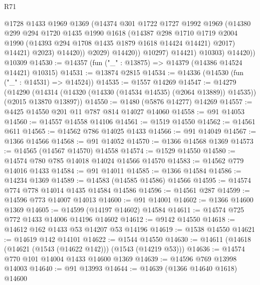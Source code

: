 \begin{lexlean}{R71}
\begin{coremodule}
                        @1728
                        @1433
                        @1969
                        @1369
                        (@14374
                          @301
                          @1722
                          @1727
                          @1992
                          @1969
                          (@14380
                            @299
                            @294
                            @1720
                            @1435
                            @1990
                            @1618
                            (@14387
                              @298
                              @1710
                              @1719
                              @2004
                              @1990
                              (@14393 @294 @1708 @1435 @1879 @1618 @14424 @14421)
                              @2017)
                            @14421)
                          @2023)
                        @14420))
                    @2029)
                  @14420))
              @10297)
            @14421)
          @10303)
        @14420))
    @10309
@14530 := @14357 (fun ("_" : @13875) => @14379 (@14386 @14524 @14421) @10315)
@14531 := @13874 @2815
@14534 := @14336 (@14530 (fun ("_" : @14531) => @14524))
@14535 := @1557 @14269
@14547 := @14279
    (@14290 (@14314 (@14320 (@14330 (@14534 @14535) (@2064 @13889)) @14535)) (@2015 @13870 @13897))
@14550 := @1480 (@5876 @14277) @14269
@14557 := @4425 @14550 @201 @11 @787 @814 @14027 @14060
@14558 := @91 @14053
@14560 := @14557 @14558 @14106
@14561 := @1519 @14550
@14562 := @14561 @611
@14565 := @14562 @786 @14025 @1433
@14566 := @91 @14049
@14567 := @1366 @14566
@14568 := @91 @14052
@14570 := @1366 @14568 @1369
@14573 := @14565 (@14567 @14570) @14558
@14574 := @1529 @14550
@14580 := @14574 @780 @785 @14018 @14024 @14566 @14570
@14583 := @14562 @779 @14016 @1433
@14584 := @91 @14011
@14585 := @1366 @14584
@14586 := @14234 @1369
@14589 := @14583 (@14585 @14586) @14566
@14595 := @14574 @774 @778 @14014 @1435 @14584 @14586
@14596 := @14561 @287
@14599 := @14596 @773 @14007 @14013
@14600 := @91 @14001
@14602 := @1366 @14600 @1369
@14605 := @14599 (@14197 @14602) @14584
@14611 := @14574 @725 @772 @1433 @14006 @14196 @14602
@14612 := @9142 @14550
@14618 := @14612 @162 @1433 @53 @14207 @53 @14196
@14619 := @1538 @14550
@14621 := @14619 @142 @14101
@14622 := @1544 @14550
@14630 := @14611 (@14618 (@14621 (@1543 (@14622 @142))) (@1543 (@14219 @53)))
@14636 := @14574 @770 @101 @14004 @1433 @14600 @1369
@14639 := @14596 @769 @13998 @14003
@14640 := @91 @13993
@14644 := @14639 (@1366 @14640 @1618) @14600

\end{coremodule}
\end{lexlean}
